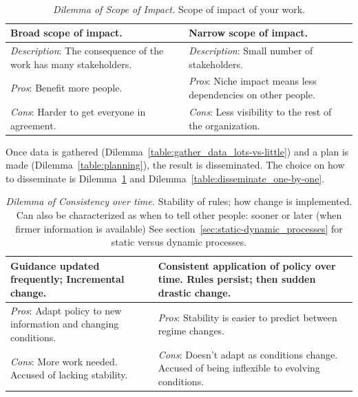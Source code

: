 \ \\

\begin{center}
\begin{table}[H] %
\begin{tabular}{ | m{\dilemmatablewidth}| m{\dilemmatablewidth} | } 
  \hline
  \textbf{Broad scope of impact.} &
  \textbf{Narrow scope of impact.} \\
  \hline
  \textit{Description}: The consequence of the work has many stakeholders. &
  \textit{Description}: Small number of stakeholders. \\  
  \hline
  \textit{Pros}: Benefit more people. &
  \textit{Pros}: Niche impact means less dependencies on other people. \\
  \hline
  \textit{Cons}: Harder to get everyone in agreement. & 
  \textit{Cons}: Less visibility to the rest of the organization. \\
  \hline
\end{tabular}
\caption{\textit{Dilemma of Scope of Impact.}
Scope of impact of your work. 
}
\end{table}
\label{table:scope_broad-vs-narrow}
\end{center}


Once data is gathered (Dilemma~\ref{table:gather_data_lots-vs-little}) and a plan is made (Dilemma~\ref{table:planning}), the result is disseminated. The choice on how to disseminate is Dilemma~\ref{table:consistency} and Dilemma~\ref{table:disseminate_one-by-one}.

\begin{center}
\begin{table}[H] %
\begin{tabular}{ | m{\dilemmatablewidth}| m{\dilemmatablewidth} | } 
  \hline
  \textbf{Guidance updated frequently; Incremental change.} & 
  \textbf{Consistent application of policy over time. Rules persist; then sudden drastic change.} \\ 
  \hline
  \textit{Pros}: Adapt policy to new information and changing conditions. &
  \textit{Pros}: Stability is easier to predict between regime changes.  \\
  \hline
  \textit{Cons}: More work needed. Accused of lacking stability. & 
  \textit{Cons}: Doesn't adapt as conditions change. Accused of being inflexible to evolving conditions. \\
  \hline
\end{tabular}
\caption{\textit{Dilemma of Consistency over time.} Stability of rules; how change is implemented. Can also be characterized as when to tell other people: sooner or later (when firmer information is available) See section~\ref{sec:static-dynamic_processes} for static versus dynamic processes.
}
\label{table:consistency}
\end{table}
\end{center}

